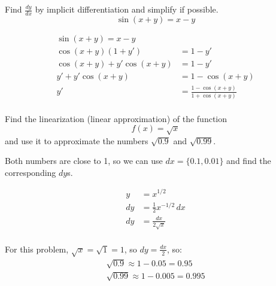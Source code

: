 \documentclass[fleqn,addpoints]{exam}
\begin{document}
\begin{questions}

\question
Find $\frac{dy}{dx}$ by implicit differentiation and simplify if possible.
\[
  \sin(x + y) = x - y
\]

\begin{solution}
\begin{align*}
  \sin(x + y) = x - y \\
  \cos(x + y)(1 + y') &= 1 - y' \\
  \cos(x + y) + y' \cos(x + y) &= 1 - y' \\
   y' + y' \cos(x + y) &= 1 - \cos(x + y) \\
   y' &= \frac{1 - \cos(x + y)}{1 + \cos(x + y)} \\
\end{align*}

\end{solution}

\question
Find the linearization (linear approximation) of the function 
\[
  f(x) = \sqrt{x}
\]
and use it to approximate the numbers $\sqrt{0.9}$ and $\sqrt{0.99}$.

\begin{solution}
Both numbers are close to 1, so we can use $dx = \{0.1, 0.01\}$ and find the corresponding $dy$s.

\begin{align*}
  y &= x^{1/2} \\
  dy &= \frac{1}{2} x^{-1/2} \, dx\\
  dy &= \frac{dx}{2 \sqrt{x}} \\
\end{align*}

For this problem, $\sqrt{x} = \sqrt{1} = 1$, so $dy = \frac{dx}{2}$, so:
\begin{align*}
  \sqrt{0.9} \approx 1 - 0.05 = 0.95 \\
  \sqrt{0.99} \approx 1 - 0.005 = 0.995 \\
\end{align*}


\end{solution}
\end{questions}
\end{document}
